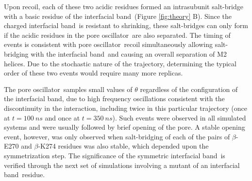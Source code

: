 \documentclass[journal=jacsat,manuscript=article]{achemso}
\newcommand{\fivering}{interfacial band~}
\newcommand{\fiveringnos}{interfacial band}
\newcommand{\triad}{pore oscillator~}
\begin{document}
\begin{enumerate}
Upon recoil, each of these two acidic residues formed an intrasubunit salt-bridge with a basic residue of the \fivering (Figure \ref{fig:theory} B). Since the charged \fivering is resistant to shrinking, these salt-bridges can only form if the acidic residues in the \triad are also separated. The timing of events is consistent with \triad recoil simultaneously allowing salt-bridging with the \fivering and causing an overall separation of M2 helices. Due to the stochastic nature of the trajectory, determining the typical order of these two events would require many more replicas.
\end{enumerate}
The \triad samples small values of $\theta$ regardless of the configuration of the \fiveringnos, due to high frequency oscillations consistent with the discontinuity in the interaction, including twice in this particular trajectory (once at $t=100~ns$ and once at $t=350~ns$). Such events were observed in all simulated systems and were usually followed by brief opening of the pore. A stable opening event, however, was only observed when salt-bridging of each of the pairs of $\beta$-E270 and $\beta$-K274 residues was also stable, which depended upon the symmetrization step.  %
The significance of the symmetric \fivering is verified through the next set of simulations involving a mutant of an \fivering residue.  
\end{document}
